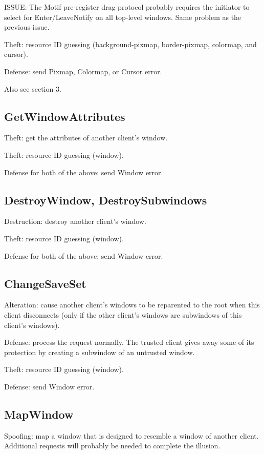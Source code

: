 \documentclass{article}
\begin{document}
ISSUE: The Motif pre-register drag protocol probably requires the
initiator to select for Enter/LeaveNotify on all top-level windows.
Same problem as the previous issue.

Theft: resource ID guessing (background-pixmap, border-pixmap,
colormap, and cursor).

Defense: send Pixmap, Colormap, or Cursor error.

Also see section 3.


\subsection{GetWindowAttributes}

Theft: get the attributes of another client's window.

Theft: resource ID guessing (window).

Defense for both of the above: send Window error.


\subsection{DestroyWindow, DestroySubwindows}

Destruction: destroy another client's window.

Theft: resource ID guessing (window).

Defense for both of the above: send Window error.


\subsection{ChangeSaveSet}

Alteration: cause another client's windows to be reparented to the
root when this client disconnects (only if the other client's windows
are subwindows of this client's windows).

Defense: process the request normally.  The trusted client gives away
some of its protection by creating a subwindow of an untrusted window.

Theft: resource ID guessing (window).

Defense: send Window error.


\subsection{MapWindow}

Spoofing: map a window that is designed to resemble a window of
another client.  Additional requests will probably be needed to
complete the illusion.
\end{document}
